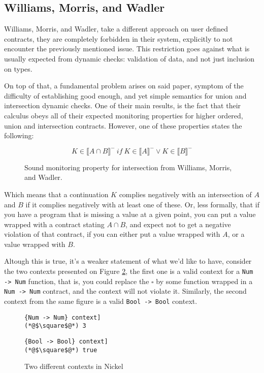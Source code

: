 \documentclass[sigplan,10pt,review,anonymous]{acmart}
\newcommand{\unsure}[2][1=]{}
\newcommand{\nickel}[1]{\lstinline[language=nickel]{#1}}
\begin{document}
\subsection*{Williams, Morris, and Wadler}
\label{sec:will-morr-wadl}
\unsure{Subsection title?}

Williams, Morris, and Wadler, take a different approach on user defined contracts,
they are completely forbidden in their system, explicitly to not encounter
the previously mentioned issue.
This restriction goes against what is usually expected from dynamic checks:
validation of data, and not just inclusion on types.

On top of that, a fundamental problem arises on said paper,
symptom of the difficulty of establishing good enough, and yet
simple semantics for union and intersection dynamic checks.
One of their main results, is the fact that their calculus obeys
all of their expected monitoring properties for higher ordered, union
and intersection contracts.
However, one of these properties states the following:

\begin{figure}[h]
$$ K \in \llbracket A \cap B \rrbracket^-~if~K \in \llbracket A \rrbracket^- \lor K \in \llbracket B \rrbracket^- $$
\caption{Sound monitoring property for intersection from Williams, Morris, and Wadler.}
\label{fig:wmw-semantics}
\end{figure}

Which means that a continuation $K$ complies negatively with an
intersection of $A$ and $B$ if it complies negatively with at least one of these.
Or, less formally, that if you have a program that is missing a value at a given point,
you can put a value wrapped with a contract stating $A \cap B$,
and expect not to get a negative violation of that contract,
if you can either put a value
wrapped with $A$, or a value wrapped with $B$.

Altough this is true, it's a weaker statement of what we'd like to have,
consider the two contexts presented on Figure \ref{fig:valid-contexts},
the first one is a valid context for a \nickel{Num -> Num} function,
that is, you could replace the $\square$ by some function wrapped in a
\nickel{Num -> Num} contract, and the context will not violate it.
Similarly, the second context from the same figure is a valid
\nickel{Bool -> Bool} context.

\begin{figure}[h]
\begin{lstlisting}[language=nickel, title=\nickel{Num -> Num} context]
(*@$\square$@*) 3
\end{lstlisting}
\begin{lstlisting}[language=nickel, title=\nickel{Bool -> Bool} context]
(*@$\square$@*) true
\end{lstlisting}
\caption{Two different contexts in Nickel}
\label{fig:valid-contexts}
\end{figure}
\end{document}
